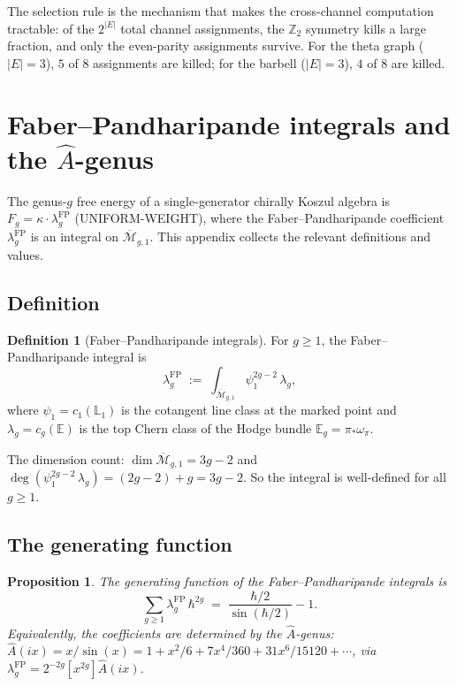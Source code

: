 \documentclass[11pt,reqno]{amsart}
\newtheorem{proposition}[theorem]{Proposition}
\theoremstyle{definition}
\newtheorem{definition}[theorem]{Definition}
\theoremstyle{remark}
\newcommand{\Mbar}{\overline{\mathcal{M}}}
\numberwithin{equation}{section}
\begin{document}
The selection rule is the mechanism that makes the
cross-channel computation tractable: of the $2^{|E|}$ total
channel assignments, the $\mathbb{Z}_2$ symmetry kills a
large fraction, and only the even-parity assignments
survive. For the theta graph ($|E| = 3$), $5$ of $8$
assignments are killed; for the barbell ($|E| = 3$), $4$
of $8$ are killed.



\section{Faber--Pandharipande integrals and the
$\hat{A}$-genus}\label{app:fp}

The genus-$g$ free energy of a single-generator chirally
Koszul algebra is $F_g = \kappa \cdot
\lambda_g^{\mathrm{FP}}$ (UNIFORM-WEIGHT), where the
Faber--Pandharipande coefficient
$\lambda_g^{\mathrm{FP}}$ is an integral on $\Mbar_{g,1}$.
This appendix collects the relevant definitions and values.

\subsection{Definition}\label{subsec:fp-def}

\begin{definition}[Faber--Pandharipande
integrals]\label{def:fp}
For $g \ge 1$, the Faber--Pandharipande integral is
\[
 \lambda_g^{\mathrm{FP}}
 \;:=\;
 \int_{\Mbar_{g,1}} \psi_1^{2g-2}\, \lambda_g,
\]
where $\psi_1 = c_1(\mathbb{L}_1)$ is the cotangent line
class at the marked point and
$\lambda_g = c_g(\mathbb{E})$ is the top Chern class of the
Hodge bundle $\mathbb{E}_g = \pi_*\omega_\pi$.
\end{definition}

The dimension count: $\dim \Mbar_{g,1} = 3g - 2$ and
$\deg(\psi_1^{2g-2}\, \lambda_g) = (2g-2) + g = 3g - 2$.
So the integral is well-defined for all $g \ge 1$.

\subsection{The generating function}
\label{subsec:fp-generating}

\begin{proposition}\label{prop:fp-generating}
The generating function of the Faber--Pandharipande
integrals is
\begin{equation}\label{eq:fp-generating}
 \sum_{g \ge 1} \lambda_g^{\mathrm{FP}}\, \hbar^{2g}
 \;=\;
 \frac{\hbar/2}{\sin(\hbar/2)} - 1.
\end{equation}
Equivalently, the coefficients are determined by the
$\hat{A}$-genus:
$\hat{A}(ix) = x/\sin(x) = 1 + x^2/6 + 7x^4/360
+ 31x^6/15120 + \cdots$, via
$\lambda_g^{\mathrm{FP}} = 2^{-2g}[x^{2g}]\hat{A}(ix)$.
\end{proposition}
\end{document}
